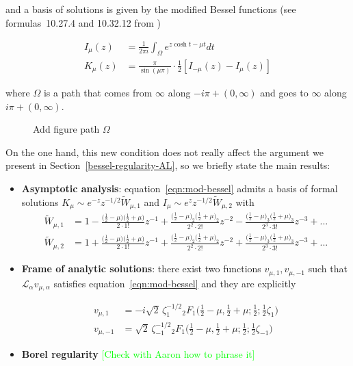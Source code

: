 \documentclass{article}
\theoremstyle{definition}
\newcommand{\laplace}{\mathcal{L}}
\begin{document}
and a basis of solutions is given by the modified Bessel functions (see formulas~10.27.4 and 10.32.12 from \cite{dlmf}) 

\begin{align*}
I_{\mu}(z)&=\frac{1}{2\pi i}\int_{\Omega} e^{z\cosh t - \mu t} dt \\
K_{\mu}(z)&=\frac{\pi}{\sin(\mu \pi)}\cdot \frac{1}{2}[ I_{-\mu}(z) - I_{\mu}(z)]
\end{align*} 

where $\Omega$ is a path that comes from $\infty$ along $-i \pi + (0, \infty)$ and goes to $\infty$ along $i \pi + (0, \infty)$.

\begin{figure}[h]
\caption{Add figure path $\Omega$}
\end{figure}

On the one hand, this new condition does not really affect the argument we present in Section~\ref{bessel-regularity-AL}, so we briefly state the main results: 

\begin{itemize}
 \item \textbf{Asymptotic analysis}: equation~\eqref{eqn:mod-bessel} admits a basis of formal solutions $K_{\mu}\sim e^{-z} z^{-1/2} \tilde{W}_{\mu, 1}$ and $I_{\mu} \sim e^z z^{-1/2} \tilde{W}_{\mu, 2}$ with 
 \begin{align*}
 \tilde{W}_{\mu,1} &= 1- \frac{\big(\tfrac{1}{2}-\mu\big)\big(\frac{1}{2}+\mu\big)}{2 \cdot 1!} z^{-1} + \frac{\big(\tfrac{1}{2}-\mu\big)_2\big(\frac{1}{2}+\mu\big)_2}{2^2 \cdot 2!} z^{-2} - \frac{\big(\tfrac{1}{2}-\mu\big)_3\big(\frac{1}{2}+\mu\big)_3}{2^3 \cdot 3!} z^{-3}+...\\
 \tilde{W}_{\mu,2} &= 1+\frac{\big(\tfrac{1}{2}-\mu\big)\big(\frac{1}{2}+\mu\big)}{2 \cdot 1!} z^{-1} + \frac{\big(\tfrac{1}{2}-\mu\big)_2\big(\frac{1}{2}+\mu\big)_2}{2^2 \cdot 2!} z^{-2}+ \frac{\big(\tfrac{1}{2}-\mu\big)_3\big(\frac{1}{2}+\mu\big)_3}{2^3 \cdot 3!} z^{-3} + ...
\end{align*}   
 \item  \textbf{Frame of analytic solutions}: there exist two functions $v_{\mu, 1}, v_{\mu, -1}$ such that $\laplace_{\alpha}v_{\mu, \alpha}$ satisfies equation~\eqref{eqn:mod-bessel} and they are explicitly 

\begin{align*}
v_{\mu, 1}&=-i\sqrt{2}\,\zeta_{1}^{-1/2}  {}_2F_1\big(\tfrac{1}{2}-\mu, \tfrac{1}{2}+\mu; \tfrac{1}{2}; \tfrac{1}{2}\zeta_{1}\big)\\
v_{\mu, -1}&=\sqrt{2}\,\zeta_{-1}^{-1/2}  {}_2F_1\big(\tfrac{1}{2}-\mu, \tfrac{1}{2}+\mu; \tfrac{1}{2}; \tfrac{1}{2}\zeta_{-1}\big)
\end{align*}
\item \textbf{Borel regularity} \textcolor{Lime}{[Check with Aaron how to phrase it]} 
\end{itemize}
\end{document}
